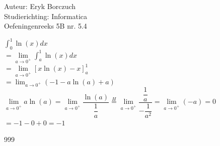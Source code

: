 \documentclass[a4paper]{article}
\begin{document}
  
\noindent \large Auteur: Eryk Borczuch \\
\noindent \large Studierichting: Informatica\\
\noindent \large Oefeningenreeks 5B nr. 5.4\\

\medskip

\normalsize

$\displaystyle \int_{0}^1 \ln(x)dx$\\

$\displaystyle = \lim\limits_{a \rightarrow 0^+} \int_{a}^1 \ln(x)dx$\\

$ = \lim\limits_{a \rightarrow 0^+} \left[x\ln(x) - x\right]_a^1$\\

$\displaystyle = \lim_{a \rightarrow 0^+} \left(-1 - a\ln(a) + a\right)$\\


$ \lim \limits_{a \rightarrow 0^+} a\ln(a) 
= \lim\limits_{a \rightarrow 0^+} \dfrac{\ln(a)}{\dfrac{1}{a}} 
\stackrel{H}{=} \lim\limits_{a \rightarrow 0^+} \dfrac{\dfrac{1}{a}}{-\dfrac{1}{a^2}} 
= \lim\limits_{a \rightarrow 0^+} (-a) = 0$\\

$\displaystyle = -1 - 0 + 0 = -1$\\


\begin{thebibliography}{999}
\end{thebibliography}
\end{document}
